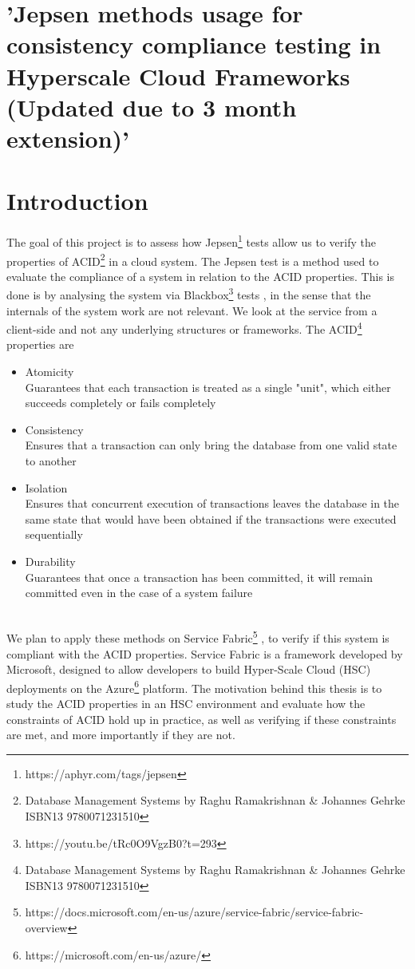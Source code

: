 \section{'Jepsen methods usage for consistency compliance testing in Hyperscale Cloud Frameworks (Updated due to 3 month extension)'}

\section{Introduction}
The goal of this project is to assess how Jepsen\footnote[1]{https://aphyr.com/tags/jepsen } tests allow us to verify the properties of ACID\footnote[2]{Database Management Systems by Raghu Ramakrishnan \& Johannes Gehrke  ISBN13 9780071231510} in a cloud system.
The Jepsen test is a method used to evaluate the compliance of a system in relation to the ACID properties. This is done is by analysing the system via Blackbox\footnote[3]{https://youtu.be/tRc0O9VgzB0?t=293} tests , in the sense that the internals of the system work are not relevant. We look at the service from a client-side and not any underlying structures or frameworks.
The ACID\footnote[2]{Database Management Systems by Raghu Ramakrishnan \& Johannes Gehrke  ISBN13 9780071231510} properties are 
\begin{itemize}
\item	Atomicity \\
Guarantees that each transaction is treated as a single "unit", which either succeeds completely or fails completely 
\item	Consistency \\
Ensures that a transaction can only bring the database from one valid state to another
\item	Isolation \\
Ensures that concurrent execution of transactions leaves the database in the same state that would have been obtained if the transactions were executed sequentially 
\item	Durability \\
Guarantees that once a transaction has been committed, it will remain committed even in the case of a system failure 
\end{itemize}
 \\
We plan to apply these methods on Service Fabric\footnote[4]{https://docs.microsoft.com/en-us/azure/service-fabric/service-fabric-overview  } , to verify if this system is compliant with the ACID properties. Service Fabric is a framework developed by Microsoft, designed to allow developers to build Hyper-Scale Cloud (HSC) deployments on the Azure\footnote[5]{https://microsoft.com/en-us/azure/ } platform.
The motivation behind this thesis is to study the ACID properties in an HSC environment and evaluate how the constraints of ACID hold up in practice, as well as verifying if these constraints are met, and more importantly if they are not. 
